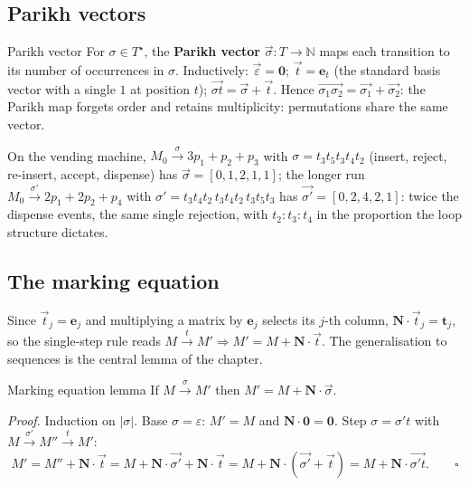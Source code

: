 \subsection{Parikh vectors}

\begin{definitionbox}{Parikh vector}
For $\sigma \in T^\star$, the \textbf{Parikh vector} $\vec{\sigma} : T \to \mathbb{N}$ maps each transition to its number of occurrences in $\sigma$. Inductively: $\vec{\varepsilon} = \mathbf{0}$; $\vec{t} = \mathbf{e}_t$ (the standard basis vector with a single $1$ at position $t$); $\vec{\sigma t} = \vec{\sigma} + \vec{t}$. Hence $\vec{\sigma_1 \sigma_2} = \vec{\sigma_1} + \vec{\sigma_2}$: the Parikh map forgets order and retains multiplicity: permutations share the same vector.
\end{definitionbox}

On the vending machine, $M_0 \xrightarrow{\sigma} 3p_1 + p_2 + p_3$ with $\sigma = t_3 t_5 t_3 t_4 t_2$ (insert, reject, re-insert, accept, dispense) has $\vec{\sigma} = [0, 1, 2, 1, 1]$; the longer run $M_0 \xrightarrow{\sigma'} 2p_1 + 2p_2 + p_4$ with $\sigma' = t_3 t_4 t_2\, t_3 t_4 t_2\, t_3 t_5 t_3$ has $\vec{\sigma'} = [0, 2, 4, 2, 1]$: twice the dispense events, the same single rejection, with $t_2 : t_3 : t_4$ in the proportion the loop structure dictates.

\subsection{The marking equation}

Since $\vec{t}_j = \mathbf{e}_j$ and multiplying a matrix by $\mathbf{e}_j$ selects its $j$-th column, $\mathbf{N} \cdot \vec{t}_j = \mathbf{t}_j$, so the single-step rule reads $M \xrightarrow{t} M' \Rightarrow M' = M + \mathbf{N} \cdot \vec{t}$. The generalisation to sequences is the central lemma of the chapter.

\begin{definitionbox}{Marking equation lemma}
If $M \xrightarrow{\sigma} M'$ then $M' = M + \mathbf{N} \cdot \vec{\sigma}$.
\par\smallskip
\textit{Proof.} Induction on $|\sigma|$. Base $\sigma = \varepsilon$: $M' = M$ and $\mathbf{N} \cdot \mathbf{0} = \mathbf{0}$. Step $\sigma = \sigma' t$ with $M \xrightarrow{\sigma'} M'' \xrightarrow{t} M'$:
\[
M' = M'' + \mathbf{N} \cdot \vec{t} = M + \mathbf{N} \cdot \vec{\sigma'} + \mathbf{N} \cdot \vec{t} = M + \mathbf{N} \cdot (\vec{\sigma'} + \vec{t}) = M + \mathbf{N} \cdot \vec{\sigma' t}. \qquad \square
\]
\end{definitionbox}

